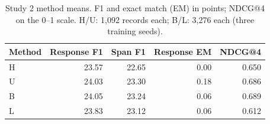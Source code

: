 \begin{table}[htbp]\centering\small
\caption{Study 2 method means. F1 and exact match (EM) in points; NDCG@4 on the 0--1 scale. H/U: 1,092 records each; B/L: 3,276 each (three training seeds).}\label{tab:methods}
\begin{tabular}{lrrrr}\toprule
Method & Response F1 & Span F1 & Response EM & NDCG@4\\\midrule
H & 23.57 & 22.65 & 0.00 & 0.650\\
U & 24.03 & 23.30 & 0.18 & 0.686\\
B & 24.05 & 23.24 & 0.06 & 0.689\\
L & 23.83 & 23.12 & 0.06 & 0.612\\
\bottomrule\end{tabular}\end{table}
